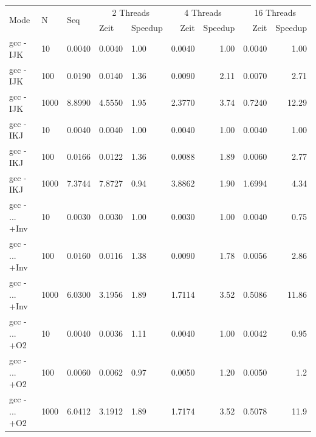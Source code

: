 \documentclass{article}
\begin{document}
			\begin{center}
			\begin{tabular}{|l|p{1cm}|p{1cm}|p{1cm}|p{1.5cm}|r|r|r|r|}
				\hline
			\multirow{2}{*}{Mode} & \multirow{2}{*}{N} & \multirow{2}{*}{Seq} & \multicolumn{2}{|c|}{2 Threads} & \multicolumn{2}{|c|}{4 Threads} & \multicolumn{2}{|c|}{16 Threads} \\
				& & & Zeit & Speedup & Zeit & Speedup & Zeit & Speedup \\
				\hline
				gcc - IJK & 10 & 		   0.0040  &     0.0040  &  1.00&      0.0040   & 1.00 &      0.0040  &  1.00\\
				
				gcc - IJK & 100 &           0.0190  &     0.0140  &  1.36&      0.0090   & 2.11&      0.0070  & 2.71\\
				
				gcc - IJK & 1000 &          8.8990  &     4.5550  &  1.95&        2.3770   & 3.74&       0.7240  & 12.29\\
				\hline
				gcc - IKJ  & 10 & 			0.0040  & 	 0.0040  & 1.00 & 	  0.0040  &  1.00&			0.0040 & 1.00\\
				
				gcc - IKJ & 100 &			0.0166  &     0.0122  &  1.36&		 0.0088  & 1.89&         0.0060  & 2.77\\
				
				gcc - IKJ & 1000 & 			7.3744  & 	 7.8727  & 0.94& 	  3.8862 & 1.90&         1.6994  & 4.34\\
				\hline
				gcc - ... +Inv & 10 &      0.0030  &     0.0030  & 1.00&       0.0030  & 1.00&        0.0040  & 0.75\\
				gcc - ... +Inv & 100 &	    0.0160  &     0.0116  & 1.38&       0.0090  & 1.78&			0.0056 & 2.86\\
				gcc - ... +Inv & 1000 & 	6.0300  &	3.1956  & 1.89&			1.7114 & 3.52&		0.5086 & 11.86\\
				\hline
				gcc - ... +O2 & 10 &  0.0040  &     0.0036  &  1.11&      0.0040   & 1.00&      0.0042  &  0.95\\
				 
				gcc - ... +O2 & 100 & 0.0060  &	  0.0062  &  0.97 &		0.0050  & 1.20 &        0.0050  &  1.2\\
				
				gcc - ... +O2 & 1000 & 6.0412  & 	3.1912 & 1.89 &       1.7174  & 3.52 &		  0.5078 & 11.9\\
				\hline
			\end{tabular}
		\end{center}
\end{document}
